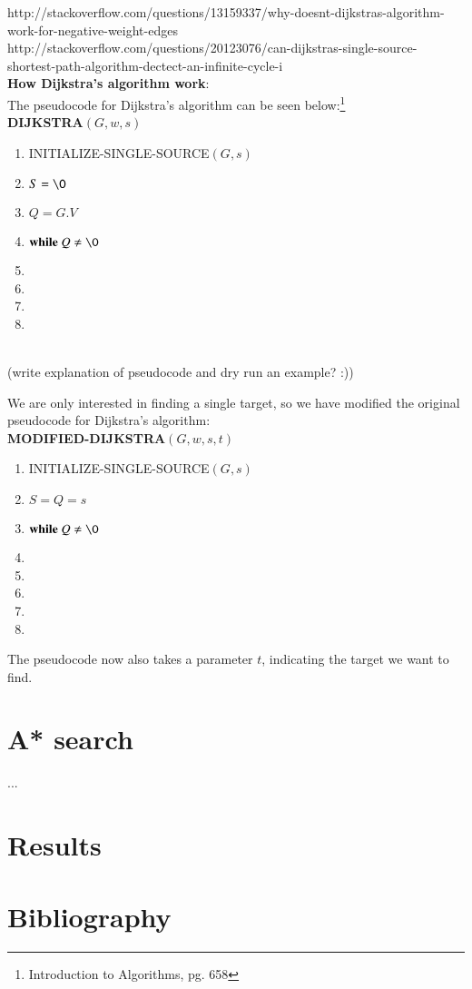 \documentclass[11pt]{article}
\begin{document}
http://stackoverflow.com/questions/13159337/why-doesnt-dijkstras-algorithm-work-for-negative-weight-edges\\

http://stackoverflow.com/questions/20123076/can-dijkstras-single-source-shortest-path-algorithm-dectect-an-infinite-cycle-i\\

\noindent
\textbf{How Dijkstra's algorithm work}:\\
The pseudocode for Dijkstra's algorithm can be seen below:\footnote{Introduction to Algorithms, pg. 658}\\


\textbf{DIJKSTRA$(G, w, s)$}
\begin{enumerate}
\setlength\itemsep{0em}
\item INITIALIZE-SINGLE-SOURCE$(G, s)$
\item $S = \O$
\item $Q = G.V$
\item $\textbf{while } Q \neq \O$
\item {}
\item {}
\item {}
\item \tab{}
\end{enumerate}

\noindent
\\
(write explanation of pseudocode and dry run an example? :))


We are only interested in finding a single target, so we have modified the original pseudocode for Dijkstra's algorithm:\\ 
\textbf{MODIFIED-DIJKSTRA$(G, w, s, t)$}
\begin{enumerate}
\setlength\itemsep{0em}
\item INITIALIZE-SINGLE-SOURCE$(G, s)$
\item $S = Q = {s}$
\item $\textbf{while } Q \neq \O$
\item {}
\item {}
\item {}
\item {}
\item \tab{}
\end{enumerate}

The pseudocode now also takes a parameter $t$, indicating the target we want to find. 



\section{A* search}
...\\



\section{Results}
\section{Bibliography}
\end{document}
